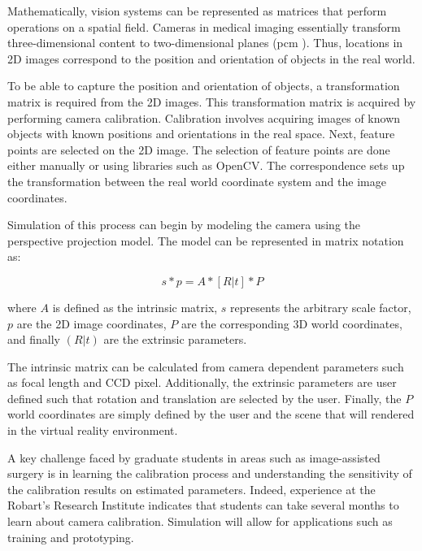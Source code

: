 \documentclass[11pt]{report}
\begin{document}
Mathematically, vision systems can be represented as matrices that perform operations on a spatial field. Cameras in medical imaging essentially transform three-dimensional content to two-dimensional planes (\gls{pcm} \cite{CV}). Thus, locations in 2D images correspond to the position and orientation of objects in the real world.

To be able to capture the position and orientation of objects, a transformation matrix is required from the 2D images. This transformation matrix is acquired by performing camera calibration. Calibration involves acquiring images of known objects with known positions and orientations in the real space. Next, feature points are selected on the 2D image. The selection of feature points are done either manually or using libraries such as OpenCV. The correspondence sets up the transformation between the real world coordinate system and the image coordinates.

Simulation of this process can begin by modeling the camera using the perspective projection model. The model can be represented in matrix notation as:

\begin{equation} s * p = A * [R|t] * P  \end{equation}
 
where  \(A\) is defined as the intrinsic matrix, \(s\) represents the arbitrary scale factor, \(p\) are the 2D image coordinates, \(P\) are the corresponding 3D world coordinates, and finally \((R|t)\) are the extrinsic parameters.

The intrinsic matrix can be calculated from camera dependent parameters such as focal length and CCD pixel. Additionally, the extrinsic parameters are user defined such that rotation and translation are selected by the user. Finally, the \(P\) world coordinates are simply defined by the user and the scene that will rendered in the virtual reality environment. 

A key challenge faced by graduate students in areas such as image-assisted surgery is in learning the calibration process and understanding the sensitivity of the calibration results on estimated parameters. Indeed, experience at the Robart's Research Institute indicates that students can take several months to learn about camera calibration. Simulation will allow for applications such as training and prototyping. 

\end{document}
